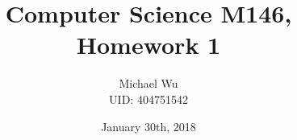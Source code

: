 \documentclass[12pt]{article}
\begin{document}
\title{Computer Science M146, Homework 1}
\date{January 30th, 2018}
\author{Michael Wu\\UID: 404751542}
\maketitle
\end{document}

